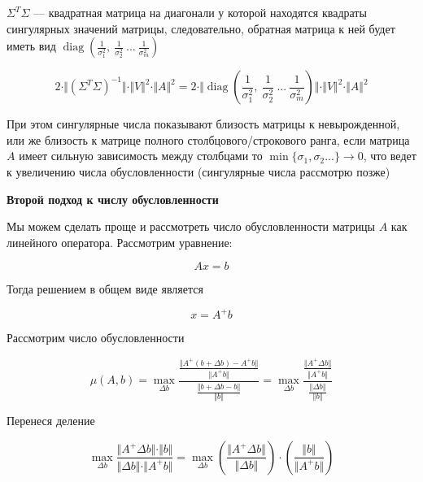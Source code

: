 \documentclass{article}
\begin{document}
    $\Sigma^{T} \Sigma$ --- квадратная матрица на диагонали у которой находятся квадраты сингулярных значений матрицы,
    следовательно, обратная матрица к ней будет иметь вид $\operatorname{diag}(\frac{1}{\sigma_{1}^{2} }, \ \frac{1}{\sigma_{2}^{2} } \ ... \ \frac{1}{\sigma_{m}^{2} })$


    \begin{equation}
        2 \cdot \Vert (\Sigma^{T} \Sigma)^{-1} \Vert \cdot \Vert V \Vert^{2} \cdot \Vert A \Vert^{2} = 2 \cdot \Vert     \operatorname{diag}(\frac{1}{\sigma_{1}^{2} }, \ \frac{1}{\sigma_{2}^{2} } \ ... \ \frac{1}{\sigma_{m}^{2} })\Vert \cdot \Vert V \Vert^{2} \cdot \Vert A \Vert^{2}
    \end{equation}

    При этом сингулярные числа показывают близость матрицы к невырожденной, или же близость к матрице полного столбцового/строкового ранга,
    если матрица $A$ имеет сильную зависимость между столбцами то $\min\{\sigma_{1}, \sigma_{2} ... \} \rightarrow 0$, что ведет к увеличению числа обусловленности (сингулярные числа рассмотрю позже)

    \quad

    \textbf{Второй подход к числу обусловленности}

    \quad

    Мы можем сделать проще и рассмотреть число обусловленности матрицы $A$ как линейного оператора.
    Рассмотрим уравнение:

    \begin{equation}
        Ax = b
    \end{equation}

    Тогда решением в общем виде является

    \begin{equation}
        x = A^{+} b
    \end{equation}

    Рассмотрим число обусловленности

    \begin{equation}
        \mu(A, b) = \max_{\Delta b} \frac{ \frac{\Vert A^{+} (b + \Delta b) - A^{+} b \Vert}{ \Vert A^{+} b \Vert } }{ \frac{\Vert b + \Delta b - b \Vert}{\Vert b \Vert} } =
        \max_{\Delta b} \frac{ \frac{\Vert A^{+} \Delta b \Vert}{ \Vert A^{+} b \Vert } }{ \frac{\Vert \Delta b \Vert}{\Vert b \Vert} }
    \end{equation}

    Перенеся деление

    \begin{equation}
        \max_{\Delta b} \frac{ \Vert A^{+} \Delta b \Vert \cdot  \Vert b \Vert   }{ \Vert \Delta b \Vert \cdot  \Vert A^{+} b \Vert } =
        \max_{\Delta b} (\frac{\Vert A^{+} \Delta b \Vert}{\Vert \Delta b \Vert}) \cdot (\frac{\Vert b \Vert }{\Vert A^{+} b \Vert})
    \end{equation}
\end{document}
